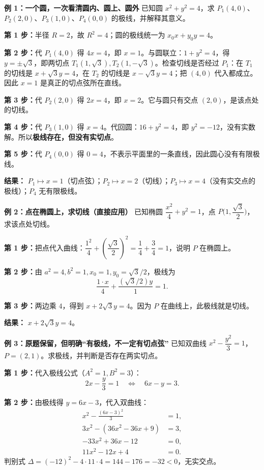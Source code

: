 \begin{examplebox}
\textbf{\textcolor{CExample}{例 1：一个圆，一次看清圆内、圆上、圆外}}
已知圆 $x^2+y^2=4$，求 $P_1(4,0)$、$P_2(2,0)$、$P_3(1,0)$、$P_4(0,0)$ 的极线，并解释其意义。

\textbf{第 1 步：}半径 $R=2$，故 $R^2=4$；圆的极线统一为 $x_0x+y_0y=4$。

\textbf{第 2 步：}代 $P_1(4,0)$ 得 $4x=4$，即 $x=1$。与圆联立：$1+y^2=4$，得 $y=\pm\sqrt3$，即两切点 $T_1(1,\sqrt3),T_2(1,-\sqrt3)$。检查切线是否经过 $P_1$：在 $T_1$ 的切线是 $x+\sqrt3y=4$，在 $T_2$ 的切线是 $x-\sqrt3y=4$；把 $(4,0)$ 代入都成立。因此 $x=1$ 是真正的切点弦所在直线。

\textbf{第 3 步：}代 $P_2(2,0)$ 得 $2x=4$，即 $x=2$。它与圆只有交点 $(2,0)$，是该点处的切线。

\textbf{第 4 步：}代 $P_3(1,0)$ 得 $x=4$。代回圆：$16+y^2=4$，即 $y^2=-12$，没有实数解。所以\textbf{极线存在，但没有实切点}。

\textbf{第 5 步：}代 $P_4(0,0)$ 得 $0=4$，不表示平面里的一条直线，因此圆心没有有限极线。

\textbf{结果：} $P_1\mapsto x=1$（切点弦）；$P_2\mapsto x=2$（切线）；$P_3\mapsto x=4$（没有实交点的极线）；$P_4$ 无有限极线。

\medskip
\textbf{\textcolor{CExample}{例 2：点在椭圆上，求切线（直接应用）}}
已知椭圆 $\dfrac{x^2}{4}+y^2=1$，点 $P\bigl(1,\dfrac{\sqrt3}{2}\bigr)$，求该点处切线。

\textbf{第 1 步：}把点代入曲线：$\dfrac{1^2}{4}+(\dfrac{\sqrt3}{2})^2=\dfrac14+\dfrac34=1$，说明 $P$ 在椭圆上。

\textbf{第 2 步：}由 $a^2=4,b^2=1,x_0=1,y_0=\sqrt3/2$，极线为
\[
\frac{1\cdot x}{4}+\frac{(\sqrt3/2)y}{1}=1.
\]

\textbf{第 3 步：}两边乘 $4$，得到 $x+2\sqrt3y=4$。因为 $P$ 在曲线上，此极线就是切线。

\textbf{结果：} $\boxed{x+2\sqrt3y=4}$。

\medskip
\textbf{\textcolor{CExample}{例 3：原题保留，但明确“有极线，不一定有切点弦”}}
已知双曲线 $x^2-\dfrac{y^2}{3}=1$，$P=(2,1)$。求极线，并判断是否存在两实切点。

\textbf{第 1 步：}代入极线公式（$A^2=1,B^2=3$）：
\[
2x-\frac{y}{3}=1\quad\Longleftrightarrow\quad 6x-y=3.
\]

\textbf{第 2 步：}由极线得 $y=6x-3$，代入双曲线：
\[
\begin{aligned}
x^2-\frac{(6x-3)^2}{3}&=1,\\
3x^2-(36x^2-36x+9)&=3,\\
-33x^2+36x-12&=0,\\
11x^2-12x+4&=0.
\end{aligned}
\]
判别式 $\Delta=(-12)^2-4\cdot11\cdot4=144-176=-32<0$，无实交点。


\end{examplebox}
